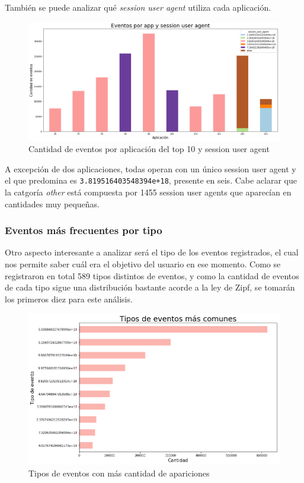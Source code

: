 \documentclass[a4paper, 12pt]{article}
\begin{document}
		También se puede analizar qué \textit{session user agent} utiliza cada aplicación.
		
		\FloatBarrier
		\begin{figure}[h]
			\centering
			\includegraphics[width=\textwidth]{images/events/evxsua.png}
			\caption{Cantidad de eventos por aplicación del top 10 y session user agent}
		\end{figure}
		\FloatBarrier
		
		A excepción de dos aplicaciones, todas operan con un único session user agent y el que predomina es \texttt{3.819516403548394e+18}, presente en seis. Cabe aclarar que la catgoría \textit{other} está compuesta por 1455 session user agents que aparecían en cantidades muy pequeñas.
		
	\subsubsection{Eventos más frecuentes por tipo}
	
		Otro aspecto interesante a analizar será el tipo de los eventos registrados, el cual nos permite saber cuál era el objetivo del usuario en ese momento. Como se registraron en total 589 tipos distintos de eventos, y como la cantidad de eventos de cada tipo sigue una distribución bastante acorde a la ley de Zipf, se tomarán los primeros diez para este análisis.
		
		\FloatBarrier
		\begin{figure}[h]
			\centering
			\includegraphics[width=\textwidth]{images/events/top10events.png}
			\caption{Tipos de eventos con más cantidad de apariciones}
		\end{figure}
		\FloatBarrier
		
\end{document}
